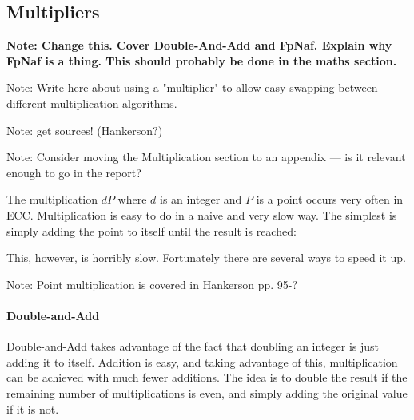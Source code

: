 \subsection{Multipliers}
\label{sec:implementation_multipliers}
\label{sec:implementation_multiplication}

\textbf{Note: Change this. Cover Double-And-Add and FpNaf. Explain why FpNaf is a thing. This should probably be done 
in the maths section.}

Note: Write here about using a "multiplier" to allow easy swapping between different multiplication algorithms.

Note: get sources! (Hankerson?)

Note: Consider moving the Multiplication section to an appendix --- is it relevant enough to go in the report?

The multiplication \(dP\) where \(d\) is an integer and \(P\) is a point occurs very often in ECC. Multiplication
is easy to do in a naive and very slow way. The simplest is simply adding the point to itself until the result is
reached:

This, however, is horribly slow. Fortunately there are several ways to speed it up.

Note: Point multiplication is covered in Hankerson pp. 95-?

\paragraph{Double-and-Add}

Double-and-Add takes advantage of the fact that doubling an integer is just adding it to itself. Addition is easy,
and taking advantage of this, multiplication can be achieved with much fewer additions. The idea is to double the
result if the remaining number of multiplications is even, and simply adding the original value if it is not.
